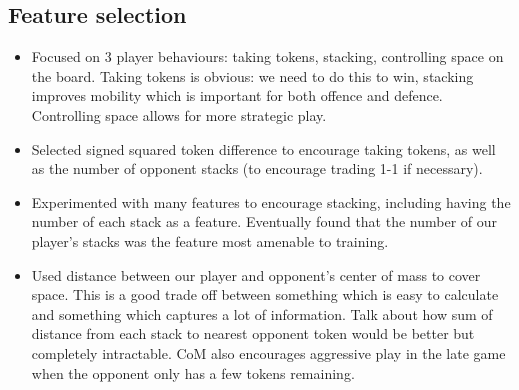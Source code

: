 \documentclass[11pt]{article}
\newcommand{\drafting}[1]{\textcolor{OliveGreen}{#1}}
\begin{document}
\subsection{Feature selection}
\drafting{
    \begin{itemize}
        \item Focused on 3 player behaviours: taking tokens, stacking, controlling space on the board. Taking tokens is obvious: we need to do this to win, stacking improves mobility which is important for both offence and defence. Controlling space allows for more strategic play.
        \item Selected signed squared token difference to encourage taking tokens, as well as the number of opponent stacks (to encourage trading 1-1 if necessary).
        \item Experimented with many features to encourage stacking, including having the number of each stack as a feature. Eventually found that the number of our player's stacks was the feature most amenable to training.
        \item Used distance between our player and opponent's center of mass to cover space. This is a good trade off between something which is easy to calculate and something which captures a lot of information. Talk about how sum of distance from each stack to nearest opponent token would be better but completely intractable. CoM also encourages aggressive play in the late game when the opponent only has a few tokens remaining.
    \end{itemize}
}
\end{document}
